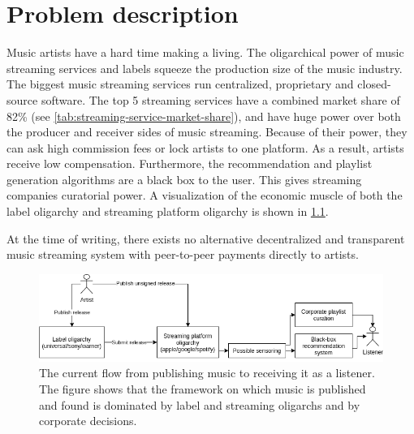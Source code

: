 \chapter{\label{chap:related-work}Problem description}
Music artists have a hard time making a living. The oligarchical power of music streaming services and labels squeeze the production size of the music industry. The biggest music streaming services run centralized, proprietary and closed-source software. The top 5 streaming services have a combined market share of 82\% (see \ref{tab:streaming-service-market-share}), and have huge power over both the producer and receiver sides of music streaming. Because of their power, they can ask high commission fees or lock artists to one platform. As a result, artists receive low compensation. Furthermore, the recommendation and playlist generation algorithms are a black box to the user. This gives streaming companies curatorial power. A visualization of the economic muscle of both the label oligarchy and streaming platform oligarchy is shown in \ref{fig:current-music-publishing-situation}.

At the time of writing, there exists no alternative decentralized and transparent music streaming system with peer-to-peer payments directly to artists. 

\begin{figure}
    \centering
    \includegraphics[width=1\linewidth]{problem-description/current-music-publishing-situation.png}
    \caption{The current flow from publishing music to receiving it as a listener. The figure shows that the framework on which music is published and found is dominated by label and streaming oligarchs and by corporate decisions.}
    \label{fig:current-music-publishing-situation}
\end{figure}


